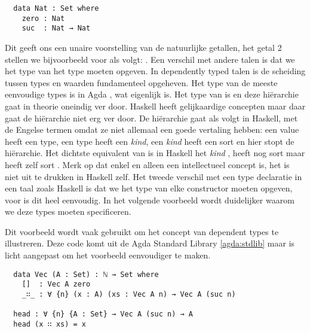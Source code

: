 \begin{verbatim}
  data Nat : Set where
    zero : Nat
    suc  : Nat → Nat
\end{verbatim}

Dit geeft ons een unaire voorstelling van de natuurlijke getallen, het getal 2
stellen we bijvoorbeeld voor als volgt: . Een verschil
met andere talen is dat we het type van het type moeten opgeven.  In
dependently typed talen is de scheiding tussen types en waarden fundamenteel
opgeheven. Het type van de meeste eenvoudige types is in Agda , wat
eigenlijk  is. Het type van  is  en deze
hiërarchie gaat in theorie oneindig ver door. Haskell heeft gelijkaardige
concepten maar daar gaat de hiërarchie niet erg ver door. De hiërarchie gaat
als volgt in Haskell, met de Engelse termen omdat ze niet allemaal een goede
vertaling hebben: een value heeft een type, een type heeft een \emph{kind}, een
\emph{kind} heeft een sort en hier stopt de hiërarchie. Het dichtste equivalent
van  is in Haskell het \emph{kind} \ihask{*}, \ihask{*} heeft nog
sort  maar  heeft zelf sort . Merk op dat
 enkel en alleen een intellectueel concept is, het is niet uit te
drukken in Haskell zelf.  Het tweede verschil met een type declaratie in een
taal zoals Haskell is dat we het type van elke constructor moeten opgeven, voor
 is dit heel eenvoudig. In het volgende voorbeeld wordt duidelijker
waarom we deze types moeten specificeren.

Dit voorbeeld wordt vaak gebruikt om het concept van dependent types te
illustreren. Deze code komt uit de Agda Standard Library \ref{agda:stdlib} maar
is licht aangepast om het voorbeeld eenvoudiger te maken.

\begin{verbatim}
  data Vec (A : Set) : ℕ → Set where
    []  : Vec A zero
    _∷_ : ∀ {n} (x : A) (xs : Vec A n) → Vec A (suc n)

  head : ∀ {n} {A : Set} → Vec A (suc n) → A
  head (x ∷ xs) = x
\end{verbatim}

